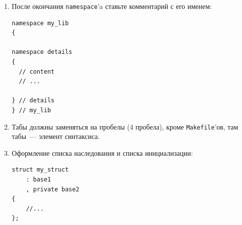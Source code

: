 \documentclass[a4paper,10pt]{article}
\begin{document}
\begin{enumerate}
    \item После окончания {\tt namespace}'a ставьте комментарий с его именем:
        \begin{lstlisting}
namespace my_lib
{

namespace details 
{
  // content
  // ...

} // details 
} // my_lib
        \end{lstlisting}

    \item Табы должны заменяться на пробелы (4 пробела), кроме {\tt Makefile}'ов, там
        табы~— элемент синтаксиса.
    \item Оформление списка наследования и списка инициализации:
        \begin{lstlisting}
struct my_struct
    : base1
    , private base2
{
    //...
};


\end{lstlisting}
\end{enumerate}
\end{document}
